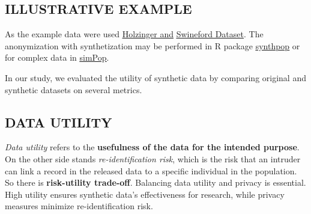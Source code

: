 \documentclass[a0,portrait]{a0poster}
\begin{document}
\begin{multicols}{3}
\section{ILLUSTRATIVE EXAMPLE}

As the example data were used 
\href{https://rdrr.io/cran/lavaan/man/HolzingerSwineford1939.html}{\color{blue}\underline{Holzinger and}} 
\href{https://rdrr.io/cran/lavaan/man/HolzingerSwineford1939.html}
{\color{blue}\underline{Swineford Dataset}}.
The anonymization with synthetization may be performed in R package \href{https://cran.r-project.org/web/packages/synthpop/index.html}{\color{blue}\underline{synthpop}}
 or for complex data in \href{https://cran.r-project.org/web/packages/simPop/index.html}{\color{blue}\underline{simPop}}.

\vspace{1cm}

In our study, we evaluated the utility of synthetic data by comparing original and synthetic datasets on several metrics.

\subsection{DATA UTILITY}

\textit{Data utility} refers to the \textbf{usefulness of the data for the intended purpose}. On the other side stands \textit{re-identification risk}, which is the risk that an intruder can link a record in the released data to a specific individual in the population. So there is \textbf{risk-utility trade-off}.
Balancing data utility and privacy is essential. High utility ensures synthetic data's effectiveness for research, while privacy measures minimize re-identification risk.


\end{multicols}
\end{document}

